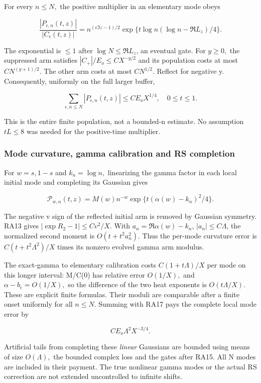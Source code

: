 For every \(n\le N,\) the positive multiplier in an elementary mode obeys

\[
\frac{|P_{\epsilon,n}(t,z)|}{|C_\epsilon(t,z)|}
 =n^{(\epsilon\Im z-1)/2}
   \exp\{t\log n(\log n-\Re L_z)/4\}.
\tag{RA16}\label{eq:ansatz-ra16}
\]

The exponential is \(\le 1\) after \(\log N\le \Re L_{z}\), an eventual gate. For \(y\ge 0,\) the suppressed arm satisfies \(|C_+|/E_{o}\le C X^{-y/2}\) and its population costs at most \(C N^{(y+1)/2}\). The other arm costs at most \(C N^{1/2}\). Reflect for negative y. Consequently, uniformly on the full larger buffer,

\[
\sum_{\epsilon,n\le N}|P_{\epsilon,n}(t,z)|
 \le C E_o X^{1/4},\quad0\le t\le1.
\tag{RA17}\label{eq:ansatz-ra17}
\]

This is the entire finite population, not a bounded-n estimate. No assumption \(tL\le 8\) was needed for the positive-time multiplier.

\subsubsection{Mode curvature, gamma calibration and RS completion}
\label{subsec:ra-4}

For \(w=s,1-s\) and \(k_{n}=\log n,\) linearizing the gamma factor in each local initial mode and completing its Gaussian gives

\[
\mathcal P_{w,n}(t,z)=M(w)n^{-w}
            \exp\{t(\alpha(w)-k_n)^2/4\}.
\tag{RA18}\label{eq:ansatz-ra18}
\]

The negative v sign of the reflected initial arm is removed by Gaussian symmetry. RA13 gives \(|\exp R_{2}-1|\le C v^{2}/X\). With \(a_{n}=\Re \alpha(w)-k_{n}\), \(|a_{n}|\le C \Lambda\), the normalized second moment is \(O(t+t^{2} a_{n}^{2})\). Thus the per-mode curvature error is \(C(t+t^{2} \Lambda^{2})/X\) times its nonzero evolved gamma arm modulus.

The exact-gamma to elementary calibration costs \(C(1+t \Lambda)/X\) per mode on this longer interval: M/C(0) has relative error \(O(1/X),\) and \(\alpha-b_{\epsilon}=O(1/X),\) so the difference of the two heat exponents is \(O(t \Lambda/X).\) These are explicit finite formulas. Their moduli are comparable after a finite onset uniformly for all \(n\le N.\) Summing with RA17 pays the complete local mode error by

\[
C E_o\Lambda^2 X^{-3/4}.
\tag{RA19}\label{eq:ansatz-ra19}
\]

Artificial tails from completing these \emph{linear} Gaussians are bounded using means of size \(O(\Lambda),\) the bounded complex loss and the gates after RA15. All N modes are included in their payment. The true nonlinear gamma modes or the actual RS correction are not extended uncontrolled to infinite shifts.

